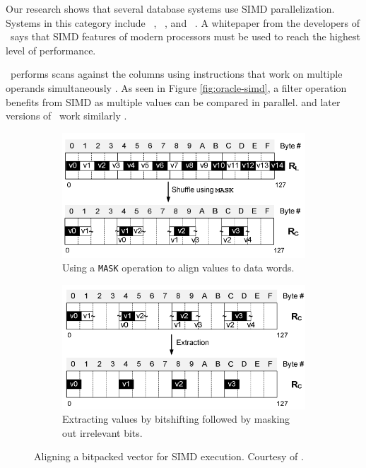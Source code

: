 Our research shows that several database systems use SIMD parallelization. Systems in this category include \oracle~\cite{Lahiri2015-mz}, \blink~\cite{Barber2012-xt}, and \ibm~\cite{Raman2013-em}. A whitepaper from the developers of \exasol~says that SIMD features of modern processors must be used to reach the highest level of performance.

\oracle~performs scans against the columns using instructions that work on multiple operands simultaneously \cite{Lahiri2015-mz}. As seen in Figure \ref{fig:oracle-simd}, a filter operation benefits from SIMD as multiple values can be compared in parallel. \ibm and later versions of \blink~work similarly \cite{Barber2012-xt, Raman2013-em}.

\begin{figure}
  \centering
  \begin{subfigure}{0.45\textwidth}
    \includegraphics[width=\textwidth]{img/simd-align-1.png}
    \caption{Using a \texttt{MASK} operation to align values to data words.}
    \label{fig:simd-align-1} 
  \end{subfigure}
  \begin{subfigure}{0.45\textwidth}
    \includegraphics[width=\textwidth]{img/simd-align-2.png}
    \caption{Extracting values by bitshifting followed by masking out irrelevant bits.}
    \label{fig:simd-align-2} 
  \end{subfigure}
  \caption{Aligning a bitpacked vector for SIMD execution. Courtesy of \cite{Willhalm2009-hu}.}
  \label{fig:simd-align} 
\end{figure}

